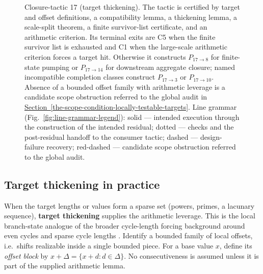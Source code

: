 \documentclass[
  11pt,
]{article}
\theoremstyle{definition}
\newcommand{\secref}[1]{\hyperref[#1]{Section~\ref*{#1}}}
\begin{document}
\begin{figure}[p]
{%
}
\caption[Closure-tactic 17: target thickening]{Closure-tactic 17 (target thickening).  The tactic is certified by target and offset definitions, a compatibility lemma, a thickening lemma, a scale-split theorem, a finite survivor-list certificate, and an arithmetic criterion.  Its terminal exits are C5 when the finite survivor list is exhausted and C1 when the large-scale arithmetic criterion forces a target hit.  Otherwise it constructs \(P_{17\to8}\) for finite-state pumping or \(P_{17\to14}\) for downstream aggregate closure; named incompatible completion classes construct \(P_{17\to3}\) or \(P_{17\to10}\).  Absence of a bounded offset family with arithmetic leverage is a candidate scope obstruction referred to the global audit in \secref{the-scope-condition-locally-testable-targets}.  Line grammar (Fig.~\ref{fig:line-grammar-legend}): solid --- intended execution through the construction of the intended residual; dotted --- checks and the post-residual handoff to the consumer tactic; dashed --- design-failure recovery; red-dashed --- candidate scope obstruction referred to the global audit.}
\label{fig:ct17-target-thickening}
\end{figure}
\FloatBarrier

\subsection*{Target thickening in practice}

When the target lengths or values form a sparse set (powers, primes, a
lacunary sequence), \textbf{target thickening} supplies the arithmetic
leverage. This is the local branch-state analogue of the broader
cycle-length forcing background around even cycles and sparse cycle
lengths
\citep{bondy-simonovits-1974-even-cycles, sudakov-verstraete-2008-cycle-lengths}.
Identify a bounded family of local offsets, i.e.~shifts realizable
inside a single bounded piece. For a base value \(x\), define its
\emph{offset block} by
\(x+\Delta=\{x+d:d\in\Delta\}\). No consecutiveness is assumed unless it
is part of the supplied arithmetic lemma.
\end{document}
